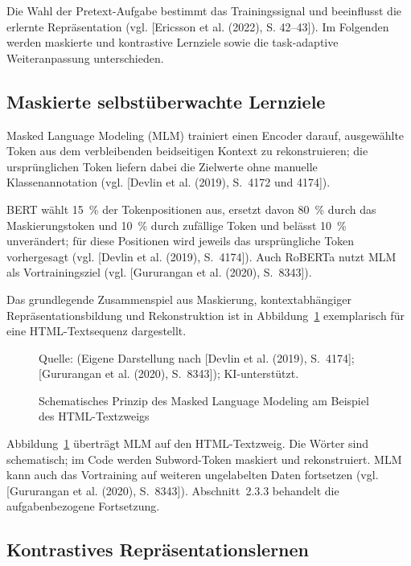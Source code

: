 Die Wahl der Pretext-Aufgabe bestimmt das Trainingssignal und beeinflusst die erlernte Repräsentation (vgl. [Ericsson et al. (2022), S. 42--43]). Im Folgenden werden maskierte und kontrastive Lernziele sowie die task-adaptive Weiteranpassung unterschieden.

\subsection{Maskierte selbstüberwachte Lernziele}

Masked Language Modeling (MLM) trainiert einen Encoder darauf, ausgewählte Token aus dem verbleibenden beidseitigen Kontext zu rekonstruieren; die ursprünglichen Token liefern dabei die Zielwerte ohne manuelle Klassenannotation (vgl. [Devlin et al. (2019), S.~4172 und 4174]).

BERT wählt 15~\% der Tokenpositionen aus, ersetzt davon 80~\% durch das Maskierungstoken und 10~\% durch zufällige Token und belässt 10~\% unverändert; für diese Positionen wird jeweils das ursprüngliche Token vorhergesagt (vgl. [Devlin et al. (2019), S.~4174]). Auch RoBERTa nutzt MLM als Vortrainingsziel (vgl. [Gururangan et al. (2020), S.~8343]).

Das grundlegende Zusammenspiel aus Maskierung, kontextabhängiger
Repräsentationsbildung und Rekonstruktion ist in Abbildung~\ref{fig:mlm-konzept}
exemplarisch für eine HTML-Textsequenz dargestellt.

\begin{figure}[H]
    \centering
    
    \caption{Schematisches Prinzip des Masked Language Modeling am Beispiel des HTML-Textzweigs}
    \label{fig:mlm-konzept}
    \vspace{0.2em}

    {\footnotesize Quelle: (Eigene Darstellung nach [Devlin et al. (2019), S.~4174]; [Gururangan et al. (2020), S.~8343]); KI-unterstützt.}
\end{figure}

Abbildung~\ref{fig:mlm-konzept} überträgt MLM auf den HTML-Textzweig. Die Wörter sind schematisch; im Code werden Subword-Token maskiert und rekonstruiert. MLM kann auch das Vortraining auf weiteren ungelabelten Daten fortsetzen (vgl. [Gururangan et al. (2020), S.~8343]). Abschnitt~2.3.3 behandelt die aufgabenbezogene Fortsetzung.

\subsection{Kontrastives Repräsentationslernen}

